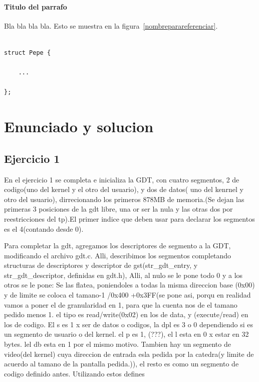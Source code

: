 \documentclass[a4paper]{article}
\newenvironment{codesnippet}{%
	\begin{Sbox}\begin{minipage}{\textwidth}\sffamily\small}%
	{\end{minipage}\end{Sbox}%
		\begin{center}%
		\vspace{-0.4cm}\colorbox{litegrey}{\TheSbox}\end{center}\vspace{0.3cm}}
\begin{document}
\paragraph{\textbf{Titulo del parrafo} } Bla bla bla bla.
Esto se muestra en la figura~\ref{nombreparareferenciar}.



\begin{codesnippet}
\begin{verbatim}

struct Pepe {

    ...

};

\end{verbatim}
\end{codesnippet}


\section{Enunciado y solucion} 
%

\newpage
\subsection{Ejercicio 1}

En el ejercicio 1 se completa e inicializa la GDT, con cuatro segmentos, 2 de codigo(uno del kernel y el otro del usuario), y dos de datos( uno del kenrnel y otro del usuario), dirrecionando los primeros 878MB de memoria.(Se dejan las primeras 3 posiciones de la gdt libre, una or ser la nula y las otras dos por reestricciones del tp).El primer indice que deben usar para declarar los segmentos es el 4(contando desde 0).




Para completar la gdt, agregamos los descriptores de segmento a la GDT, modificando el archivo gdt.c.
Alli, describimos los segmentos completando  structuras de descriptores y descriptor de gst(str_gdt_entry, y  str_gdt_descriptor, definidas en gdt.h),
Alli, al nulo se le pone todo 0 y a los otros se le pone:
Se las flatea, poniendoles a todas la misma direccion base (0x00) y de limite se coloca el tamano-1 /0x400 +0x3FF(se pone asi, porqu en realidad vamos a poner el de granularidad en 1, para que la cuenta nos de el tamano pedido menos 1.
el tipo es read/write(0x02) en los de data, y (execute/read) en los de codigo. El s es 1 x ser de datos o codigos,  la dpl es 3 o 0 dependiendo si es un segmento de usuario o del kernel. el p es 1, (???), el l esta en 0 x estar en 32 bytes. lel db esta en 1 por el mismo motivo. 
Tambien hay un segmento de video(del kernel) cuya direccion de entrada esla pedida por la catedra(y limite de acuerdo al tamano de la pantalla pedida.)), el resto es como un segmento de codigo definido antes.
Utilizando estos defines
\end{document}
